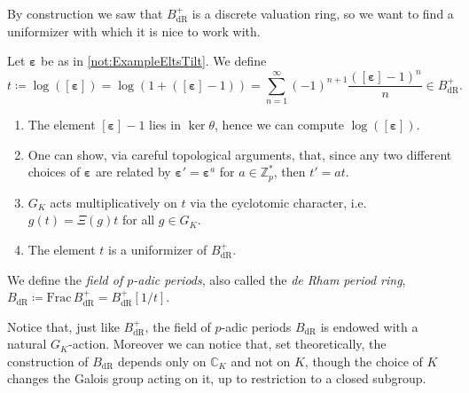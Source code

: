\noindent
By construction we saw that $B_{\mathrm{dR}}^+$ is a discrete valuation ring,
so we want to find a uniformizer with which it is nice to work with.
\begin{defn}[]
	Let $\boldsymbol\varepsilon$ be as in \cref{not:ExampleEltsTilt}.
	We define
	\begin{equation*}
		t \coloneqq \log \left( [\boldsymbol\varepsilon] \right) =
		\log \left( 1 + ([\boldsymbol\varepsilon] - 1)\right) =
		\sum_{n = 1 }^{ \infty } (-1)^{n+1} 
		\frac{ ([\boldsymbol\varepsilon] - 1)^n }{ n }
		\in B_{\mathrm{dR}}^+
	.\end{equation*}
\end{defn}


\begin{rem}\leavevmode\vspace{-\baselineskip}
\begin{enumerate}
	\item The element $[\boldsymbol\varepsilon] - 1 $ lies in
		$\ker \theta$, hence we can compute $\log ([\boldsymbol\varepsilon])$.

	\item One can show, via careful topological arguments, that,
		since any two different choices of $\boldsymbol\varepsilon$
		are related by $\boldsymbol\varepsilon' = \boldsymbol\varepsilon^a$
		for $a \in \mathbb{Z}_{p}^*$, then
		$t' = a t$.

	\item $G_K$ acts multiplicatively on $t$ via the cyclotomic character,
		i.e. $g(t) = \Xi(g) t$ for all $g \in G_K$.

	\item The element $t$ is a uniformizer of $B_{\mathrm{dR}}^+$.
\end{enumerate}
\end{rem}


\begin{defn}
	We define the {\em field of $p$-adic periods}, also called
	the {\em de Rham period ring}, 
	$B_{\mathrm{dR}} \coloneqq \mathrm{Frac}\, B_{\mathrm{dR}}^+ =
	B_{\mathrm{dR}}^+[1/t]$.
\end{defn}


\begin{rem}[]
	Notice that, just like $B_{\mathrm{dR}}^+$, the field of $p$-adic periods
	$B_{\mathrm{dR}}$ is endowed with a natural $G_K$-action.
	Moreover we can notice that, set theoretically, the construction of
	$B_{\mathrm{dR}}$ depends only on $\mathbb{C}_K$ and not on $K$,
	though the choice of $K$ changes the Galois group acting on it,
	up to restriction to a closed subgroup.
\end{rem}


